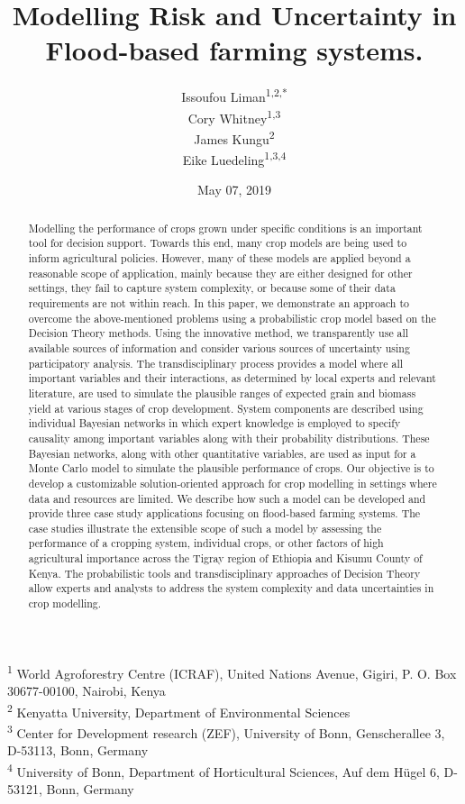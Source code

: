 \documentclass[11pt,preprint]{article}
\title{Modelling Risk and Uncertainty in Flood-based farming systems.}
\author{Issoufou Liman\textsuperscript{1,2,*} \\ Cory Whitney\textsuperscript{1,3} \\ James Kungu\textsuperscript{2} \\ Eike Luedeling\textsuperscript{1,3,4}}
\date{May 07, 2019}
\begin{document}
\maketitle
\begin{abstract}
Modelling the performance of crops grown under specific conditions is an
important tool for decision support. Towards this end, many crop models
are being used to inform agricultural policies. However, many of these
models are applied beyond a reasonable scope of application, mainly
because they are either designed for other settings, they fail to
capture system complexity, or because some of their data requirements
are not within reach. In this paper, we demonstrate an approach to
overcome the above-mentioned problems using a probabilistic crop model
based on the Decision Theory methods. Using the innovative method, we
transparently use all available sources of information and consider
various sources of uncertainty using participatory analysis. The
transdisciplinary process provides a model where all important variables
and their interactions, as determined by local experts and relevant
literature, are used to simulate the plausible ranges of expected grain
and biomass yield at various stages of crop development. System
components are described using individual Bayesian networks in which
expert knowledge is employed to specify causality among important
variables along with their probability distributions. These Bayesian
networks, along with other quantitative variables, are used as input for
a Monte Carlo model to simulate the plausible performance of crops. Our
objective is to develop a customizable solution-oriented approach for
crop modelling in settings where data and resources are limited. We
describe how such a model can be developed and provide three case study
applications focusing on flood-based farming systems. The case studies
illustrate the extensible scope of such a model by assessing the
performance of a cropping system, individual crops, or other factors of
high agricultural importance across the Tigray region of Ethiopia and
Kisumu County of Kenya. The probabilistic tools and transdisciplinary
approaches of Decision Theory allow experts and analysts to address the
system complexity and data uncertainties in crop modelling.
\end{abstract}

{
\hypersetup{linkcolor=black}
\setcounter{tocdepth}{5}
\tableofcontents
}
\textsuperscript{1} World Agroforestry Centre (ICRAF), United Nations
Avenue, Gigiri, P. O. Box 30677-00100, Nairobi, Kenya\\
\textsuperscript{2} Kenyatta University, Department of Environmental
Sciences\\
\textsuperscript{3} Center for Development research (ZEF), University of
Bonn, Genscherallee 3, D-53113, Bonn, Germany\\
\textsuperscript{4} University of Bonn, Department of Horticultural
Sciences, Auf dem Hügel 6, D-53121, Bonn, Germany
\end{document}
